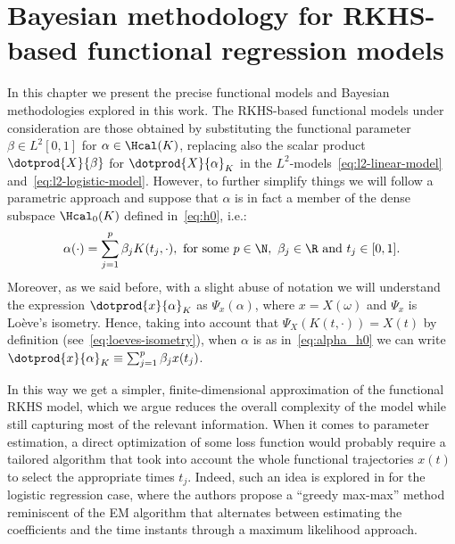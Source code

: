 %
%

\let\epsilon\varepsilon
\setlength{\footskip}{50.75pt}

\chapter{Bayesian methodology for RKHS-based functional regression models}\label{ch:bayesian}

In this chapter we present the precise functional models and Bayesian methodologies explored in this work. The RKHS-based functional models under consideration \citep[see][]{berrendero2018functional, berrendero2019rkhs} are those obtained by substituting the functional parameter \(\beta\in L^2[0,1]\) for \(\alpha \in \Hcal(K)\), replacing also the scalar product \(\dotprod{X}{\beta}\) for \(\dotprod{X}{\alpha}_K\) in the \(L^2\)-models~\eqref{eq:l2-linear-model} and~\eqref{eq:l2-logistic-model}. However, to further simplify things we will follow a parametric approach and suppose that \(\alpha\) is in fact a member of the dense subspace \(\Hcal_0(K)\) defined in~\eqref{eq:h0}, i.e.:
\begin{equation}\label{eq:alpha_h0}
\alpha(\cdot) = \sum_{j=1}^p \beta_j K(t_j, \cdot), \text{ for some } p \in \N, \ \beta_j \in \R \text{ and } t_j \in [0,1].
\end{equation}
Moreover, as we said before, with a slight abuse of notation we will understand the expression \(\dotprod{x}{\alpha}_K\) as \(\Psi_x(\alpha)\), where \(x=X(\omega)\) and \(\Psi_x\) is Loève's isometry. Hence, taking into account that \(\Psi_X(K(t, \cdot)) = X(t)\) by definition (see~\eqref{eq:loeves-isometry}), when \(\alpha\) is as in~\eqref{eq:alpha_h0} we can write \(\dotprod{x}{\alpha}_K \equiv \sum_{j=1}^p \beta_j x(t_j)\).

In this way we get a simpler, finite-dimensional approximation of the functional RKHS model, which we argue reduces the overall complexity of the model while still capturing most of the relevant information. When it comes to parameter estimation, a direct optimization of some loss function would probably require a tailored algorithm that took into account the whole functional trajectories \(x(t)\) to select the appropriate times \(t_j\). Indeed, such an idea is explored in \citet{berrendero2018functional} for the logistic regression case, where the authors propose a ``greedy max-max'' method reminiscent of the EM algorithm that alternates between estimating the coefficients and the time instants through a maximum likelihood approach.

